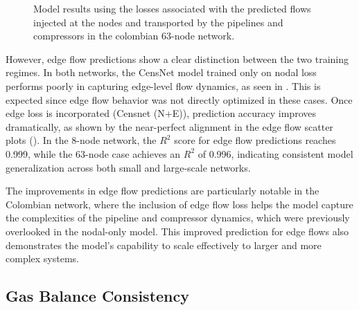 \begin{figure}
    \centering
        \setlength{}        
        \setlength{} 
        \caption{Model results using the losses associated with the predicted flows injected at the nodes and transported by the pipelines and compressors in the colombian 63-node network.}
        \label{fig:col_base_f_results}
\end{figure}


However, edge flow predictions show a clear distinction between the two training regimes. In both networks, the CensNet model trained only on nodal loss performs poorly in capturing edge-level flow dynamics, as seen in . This is expected since edge flow behavior was not directly optimized in these cases. Once edge loss is incorporated (Censnet (N+E)), prediction accuracy improves dramatically, as shown by the near-perfect alignment in the edge flow scatter plots (). In the 8-node network, the $R^2$ score for edge flow predictions reaches 0.999, while the 63-node case achieves an $R^2$ of 0.996, indicating consistent model generalization across both small and large-scale networks.

The improvements in edge flow predictions are particularly notable in the Colombian network, where the inclusion of edge flow loss helps the model capture the complexities of the pipeline and compressor dynamics, which were previously overlooked in the nodal-only model. This improved prediction for edge flows also demonstrates the model's capability to scale effectively to larger and more complex systems.

\subsection{Gas Balance Consistency}


